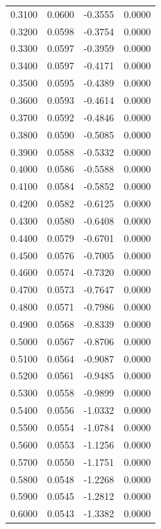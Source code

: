 \begin{table}
\begin{tabular}{rrrr}
0.3100 & 0.0600 & -0.3555 & 0.0000 \\
0.3200 & 0.0598 & -0.3754 & 0.0000 \\
0.3300 & 0.0597 & -0.3959 & 0.0000 \\
0.3400 & 0.0597 & -0.4171 & 0.0000 \\
0.3500 & 0.0595 & -0.4389 & 0.0000 \\
0.3600 & 0.0593 & -0.4614 & 0.0000 \\
0.3700 & 0.0592 & -0.4846 & 0.0000 \\
0.3800 & 0.0590 & -0.5085 & 0.0000 \\
0.3900 & 0.0588 & -0.5332 & 0.0000 \\
0.4000 & 0.0586 & -0.5588 & 0.0000 \\
0.4100 & 0.0584 & -0.5852 & 0.0000 \\
0.4200 & 0.0582 & -0.6125 & 0.0000 \\
0.4300 & 0.0580 & -0.6408 & 0.0000 \\
0.4400 & 0.0579 & -0.6701 & 0.0000 \\
0.4500 & 0.0576 & -0.7005 & 0.0000 \\
0.4600 & 0.0574 & -0.7320 & 0.0000 \\
0.4700 & 0.0573 & -0.7647 & 0.0000 \\
0.4800 & 0.0571 & -0.7986 & 0.0000 \\
0.4900 & 0.0568 & -0.8339 & 0.0000 \\
0.5000 & 0.0567 & -0.8706 & 0.0000 \\
0.5100 & 0.0564 & -0.9087 & 0.0000 \\
0.5200 & 0.0561 & -0.9485 & 0.0000 \\
0.5300 & 0.0558 & -0.9899 & 0.0000 \\
0.5400 & 0.0556 & -1.0332 & 0.0000 \\
0.5500 & 0.0554 & -1.0784 & 0.0000 \\
0.5600 & 0.0553 & -1.1256 & 0.0000 \\
0.5700 & 0.0550 & -1.1751 & 0.0000 \\
0.5800 & 0.0548 & -1.2268 & 0.0000 \\
0.5900 & 0.0545 & -1.2812 & 0.0000 \\
0.6000 & 0.0543 & -1.3382 & 0.0000 \\
\bottomrule
\end{tabular}
\end{table}
